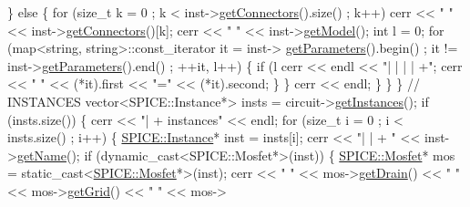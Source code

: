 \begin{DoxyCodeInclude}
                \} \textcolor{keywordflow}{else} \{
                    \textcolor{keywordflow}{for} (\textcolor{keywordtype}{size\_t} k = 0 ; k < inst->\mbox{\hyperlink{class_s_p_i_c_e_1_1_instance_acce8940edeaa3d79c522006f987e0711}{getConnectors}}().size() ; k++)
                        cerr << \textcolor{stringliteral}{" "} << inst->\mbox{\hyperlink{class_s_p_i_c_e_1_1_instance_acce8940edeaa3d79c522006f987e0711}{getConnectors}}()[k];
                    cerr << \textcolor{stringliteral}{" "} << inst->\mbox{\hyperlink{class_s_p_i_c_e_1_1_instance_afc74cbe93df9c473a53db83a325f8f9d}{getModel}}();
                    \textcolor{keywordtype}{int} l = 0;
                    \textcolor{keywordflow}{for} (map<string, string>::const\_iterator it = inst->
      \mbox{\hyperlink{class_s_p_i_c_e_1_1_instance_aee7d59083b78d31ac5c19ab508da91e0}{getParameters}}().begin() ; it != inst->\mbox{\hyperlink{class_s_p_i_c_e_1_1_instance_aee7d59083b78d31ac5c19ab508da91e0}{getParameters}}().end() ; ++it, l++) \{
                        \textcolor{keywordflow}{if} (l%
                            cerr << endl << \textcolor{stringliteral}{"| | | | +"};
                        cerr << \textcolor{stringliteral}{" "} << (*it).first << \textcolor{stringliteral}{"="} << (*it).second;
                    \}
                \}
                cerr << endl;
            \}
        \}
    \}
    \textcolor{comment}{// INSTANCES}
    vector<SPICE::Instance*> insts = circuit->\mbox{\hyperlink{class_s_p_i_c_e_1_1_circuit_a8e6e58ffab876152a740092520c35d73}{getInstances}}();
    \textcolor{keywordflow}{if} (insts.size()) \{
        cerr << \textcolor{stringliteral}{"| + instances"} << endl;
        \textcolor{keywordflow}{for} (\textcolor{keywordtype}{size\_t} i = 0 ; i < insts.size() ; i++) \{
            \mbox{\hyperlink{class_s_p_i_c_e_1_1_instance}{SPICE::Instance}}* inst = insts[i];
            cerr << \textcolor{stringliteral}{"| | + "} << inst->\mbox{\hyperlink{class_s_p_i_c_e_1_1_instance_ac0fc966d4386ddb71d99361e3fccb311}{getName}}();
            \textcolor{keywordflow}{if} (dynamic\_cast<SPICE::Mosfet*>(inst)) \{
                \mbox{\hyperlink{class_s_p_i_c_e_1_1_mosfet}{SPICE::Mosfet}}* mos = \textcolor{keyword}{static\_cast<}\mbox{\hyperlink{class_s_p_i_c_e_1_1_mosfet}{SPICE::Mosfet}}*\textcolor{keyword}{>}(inst);
                cerr << \textcolor{stringliteral}{" "} << mos->\mbox{\hyperlink{class_s_p_i_c_e_1_1_mosfet_a7265f0565b8368070a3f09c6197a4e9b}{getDrain}}() << \textcolor{stringliteral}{" "} << mos->\mbox{\hyperlink{class_s_p_i_c_e_1_1_mosfet_a796d77755aac0828419f55ba2226bf15}{getGrid}}() << \textcolor{stringliteral}{" "} << mos->

\end{DoxyCodeInclude}
